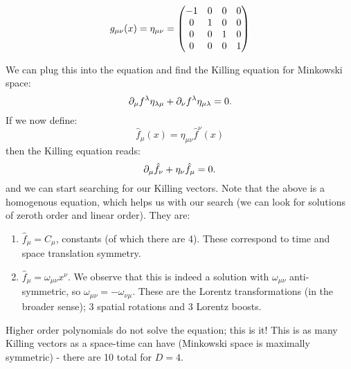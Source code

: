 \begin{equation}
    g_{\mu\nu}(x) = \eta_{\mu\nu} = \begin{pmatrix}-1 & 0 & 0 & 0 \\ 0 & 1 & 0 & 0 \\ 0 & 0 & 1 & 0 \\ 0 & 0 & 0 & 1\end{pmatrix}
\end{equation}

We can plug this into the equation and find the Killing equation for Minkowski space:
\begin{equation}
    \partial_\mu f^\lambda \eta_{\lambda\mu} + \partial_\nu f^\lambda \eta_{\mu\lambda} = 0.
\end{equation}
If we now define:
\begin{equation}
    \hat{f}_\mu(x) = \eta_{\mu\nu}\hat{f}^\nu(x)
\end{equation}
then the Killing equation reads:
\begin{equation}
    \partial_\mu \hat{f}_\nu + \eta_\nu \hat{f}_\mu = 0.
\end{equation}
and we can start searching for our Killing vectors. Note that the above is a homogenous equation, which helps us with our search (we can look for solutions of zeroth order and linear order). They are:
\begin{enumerate}
    \item $\hat{f}_\mu = C_\mu$, constants (of which there are 4). These correspond to time and space translation symmetry.
    \item $\hat{f}_\mu  = \omega_{\mu\nu}x^\nu$. We observe that this is indeed a solution with $\omega_{\mu\nu}$ anti-symmetric, so $\omega_{\mu\nu} = -\omega_{\nu\mu}$. These are the Lorentz transformations (in the broader sense); 3 spatial rotations and 3 Lorentz boosts.
\end{enumerate}
Higher order polynomials do not solve the equation; this is it! This is as many Killing vectors as a space-time can have (Minkowski space is maximally symmetric) - there are 10 total for $D = 4$.

